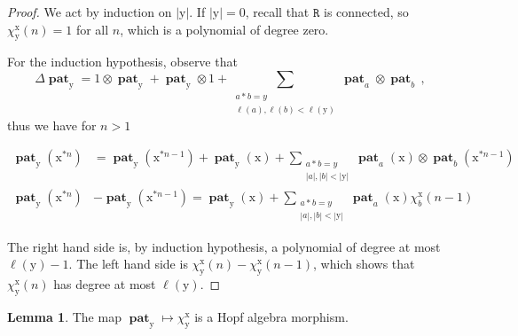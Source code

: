 \documentclass[12pt, reqno]{amsart}
\theoremstyle{definition}
\newtheorem{lm}[thm]{Lemma}
\DeclareMathOperator{\pat}{\mathbf{pat}}
\newcommand{\xx}{\mathrm{x}}
\newcommand{\yy}{\mathrm{y}}
\begin{document}
\begin{proof}
We act by induction on $|\yy|$.
If $|\yy| = 0$, recall that $\mathtt{R}$ is connected, so $\chi^{\xx}_{\yy}(n) = 1$ for all $n$, which is a polynomial of degree zero.

For the induction hypothesis, observe that 
$$\Delta \pat_{\yy} = 1\otimes \pat_{\yy} + \pat_{\yy} \otimes 1 + \sum_{\substack{a \ast b = y\\\ell(a), \ell(b) < \ell(\yy)}} \pat_a \otimes \pat_b \, ,$$
thus we have for $n > 1$ 

\begin{equation*}
    \begin{split}
        \pat_{\yy}(\xx^{\ast n}) &= \pat_{\yy}(\xx^{\ast n-1}) + \pat_{\yy}(\xx) + \sum_{\substack{a \ast b = y\\|a|, |b| < |\yy|}} \pat_a (\xx) \otimes \pat_b (\xx^{\ast n-1}) \\
         \pat_{\yy}(\xx^{\ast n}) &- \pat_{\yy}(\xx^{\ast n-1}) = \pat_{\yy}(\xx) + \sum_{\substack{a \ast b = y\\|a|, |b| < |\yy|}} \pat_a (\xx) \chi^{\xx}_b ( n-1)
    \end{split}
\end{equation*}

The right hand side is, by induction hypothesis, a polynomial of degree at most $\ell(\yy) -1$.
The left hand side is $\chi^{\xx}_{\yy}(n) - \chi^{\xx}_{\yy}(n-1)$, which shows that $\chi^{\xx}_{\yy}(n)$ has degree at most $\ell(\yy)$.
\end{proof}


\begin{lm}\label{lm:HA_morphism}
The map $\pat_{\yy} \mapsto \chi^{\xx}_{\yy}$ is a Hopf algebra morphism.
\end{lm}
\end{document}
